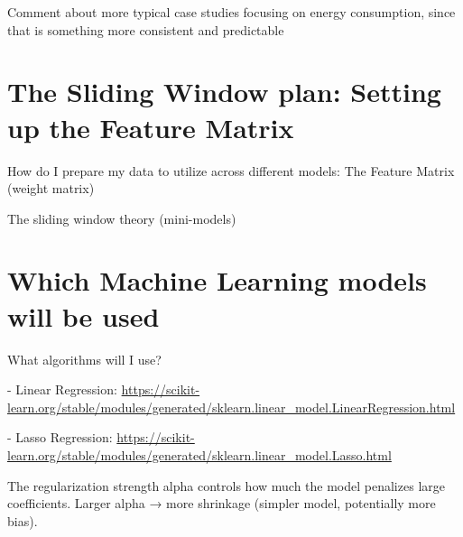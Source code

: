 \documentclass[12pt]{report} %
\begin{document}
Comment about more typical case studies focusing on energy consumption, since that is something more consistent and predictable

\section{The Sliding Window plan: Setting up the Feature Matrix}

How do I prepare my data to utilize across different models: The Feature Matrix (weight matrix)

The sliding window theory (mini-models)

\section{Which Machine Learning models will be used}
What algorithms will I use?

- Linear Regression: \url{https://scikit-learn.org/stable/modules/generated/sklearn.linear_model.LinearRegression.html}



- Lasso Regression: \url{https://scikit-learn.org/stable/modules/generated/sklearn.linear_model.Lasso.html}

The regularization strength alpha controls how much the model penalizes large coefficients. Larger alpha → more shrinkage (simpler model, potentially more bias).









\end{document}
